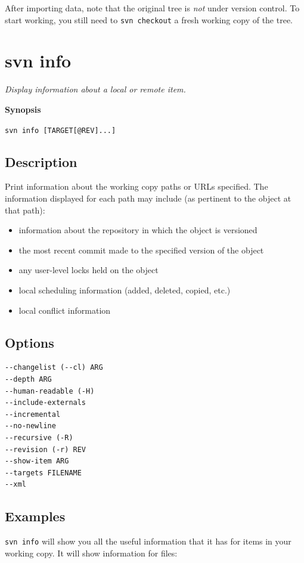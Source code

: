 After importing data, note that the original tree is \emph{not} under
version control. To start working, you still need to
\texttt{svn\ checkout} a fresh working copy of the tree.

\section{svn info}\label{svn.ref.svn.c.info}

\emph{Display information about a local or remote item.}

\textbf{Synopsis}

\texttt{svn\ info\ {[}TARGET{[}@REV{]}...{]}}

\subsection{Description}

Print information about the working copy paths or URLs specified. The
information displayed for each path may include (as pertinent to the
object at that path):

\begin{itemize}
\item
  information about the repository in which the object is versioned
\item
  the most recent commit made to the specified version of the object
\item
  any user-level locks held on the object
\item
  local scheduling information (added, deleted, copied, etc.)
\item
  local conflict information
\end{itemize}

\subsection{Options}

\begin{verbatim}
--changelist (--cl) ARG
--depth ARG
--human-readable (-H)
--include-externals
--incremental
--no-newline
--recursive (-R)
--revision (-r) REV
--show-item ARG
--targets FILENAME
--xml
\end{verbatim}

\subsection{Examples}

\texttt{svn\ info} will show you all the useful information that it has
for items in your working copy. It will show information for files:

